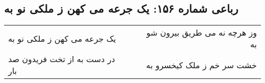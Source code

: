 \begin{center}
\section*{رباعی شماره ۱۵۶: یک جرعه می کهن ز ملکی نو به}
\label{sec:sh156}
\begin{longtable}{l p{0.5cm} r}
یک جرعه می کهن ز ملکی نو به
&&
وز هرچه نه می طریق بیرون شو به
\\
در دست به از تخت فریدون صد بار
&&
خشت سر خم ز ملک کیخسرو به
\\
\end{longtable}
\end{center}
